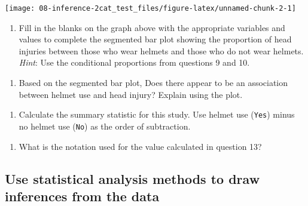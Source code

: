 \documentclass[
]{report}
\providecommand{\tightlist}{%
  \setlength{\itemsep}{0pt}\setlength{\parskip}{0pt}}
\begin{document}
\vspace{.3in}

\begin{center}\texttt{[image: 08-inference-2cat\_test\_files/figure-latex/unnamed-chunk-2-1]} \end{center}

\begin{enumerate}
\def\labelenumi{\arabic{enumi}.}
\setcounter{enumi}{10}
\tightlist
\item
  Fill in the blanks on the graph above with the appropriate variables and values to complete the segmented bar plot showing the proportion of head injuries between those who wear helmets and those who do not wear helmets. \emph{Hint}: Use the conditional proportions from questions 9 and 10.
\end{enumerate}

\vspace{1mm}

\begin{enumerate}
\def\labelenumi{\arabic{enumi}.}
\setcounter{enumi}{11}
\tightlist
\item
  Based on the segmented bar plot, Does there appear to be an association between helmet use and head injury? Explain using the plot.
\end{enumerate}

\vspace{0.7in}

\begin{enumerate}
\def\labelenumi{\arabic{enumi}.}
\setcounter{enumi}{12}
\tightlist
\item
  Calculate the summary statistic for this study. Use helmet use (\texttt{Yes}) minus no helmet use (\texttt{No}) as the order of subtraction.
\end{enumerate}

\vspace{0.5in}

\begin{enumerate}
\def\labelenumi{\arabic{enumi}.}
\setcounter{enumi}{13}
\tightlist
\item
  What is the notation used for the value calculated in question 13?
\end{enumerate}

\vspace{0.2in}
\newpage

\hypertarget{use-statistical-analysis-methods-to-draw-inferences-from-the-data}{%
\subsection*{Use statistical analysis methods to draw inferences from the data}\label{use-statistical-analysis-methods-to-draw-inferences-from-the-data}}
\end{document}
